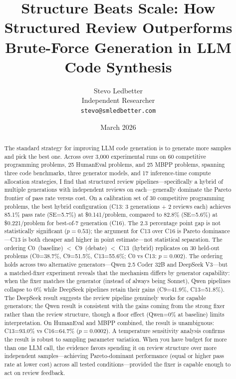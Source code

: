 \documentclass{article}
\title{Structure Beats Scale: How Structured Review Outperforms Brute-Force Generation in LLM Code Synthesis}
\author{
  Stevo Ledbetter \\
  Independent Researcher \\
  \texttt{stevo@smledbetter.com}
}
\date{March 2026}
\begin{document}
\maketitle

\begin{abstract}
The standard strategy for improving LLM code generation is to generate more samples and pick the best one. Across over 3,000 experimental runs on 60 competitive programming problems, 25 HumanEval problems, and 25 MBPP problems, spanning three code benchmarks, three generator models, and 17 inference-time compute allocation strategies, I find that structured review pipelines---specifically a hybrid of multiple generations with independent reviews on each---generally dominate the Pareto frontier of pass rate versus cost. On a calibration set of 30 competitive programming problems, the best hybrid configuration (C13: 3 generations + 2 reviews each) achieves 85.1\% pass rate (SE=5.7\%) at \$0.141/problem, compared to 82.8\% (SE=5.6\%) at \$0.221/problem for best-of-7 generation (C16). The 2.3 percentage point gap is not statistically significant ($p=0.53$); the argument for C13 over C16 is Pareto dominance---C13 is both cheaper and higher in point estimate---not statistical separation. The ordering C0~(baseline) $<$ C9~(debate) $<$ C13~(hybrid) replicates on 30 held-out problems (C0=38.7\%, C9=51.5\%, C13=55.6\%; C0 vs C13: $p=0.002$). The ordering holds across two alternative generators---Qwen 2.5 Coder 32B and DeepSeek V3---but a matched-fixer experiment reveals that the mechanism differs by generator capability: when the fixer matches the generator (instead of always being Sonnet), Qwen pipelines collapse to 0\% while DeepSeek pipelines retain their gains (C9=41.9\%, C13=51.8\%). The DeepSeek result suggests the review pipeline genuinely works for capable generators; the Qwen result is consistent with the gains coming from the strong fixer rather than the review structure, though a floor effect (Qwen=0\% at baseline) limits interpretation. On HumanEval and MBPP combined, the result is unambiguous: C13=93.0\% vs C16=64.7\% ($p=0.0002$). A temperature sensitivity analysis confirms the result is robust to sampling parameter variation. When you have budget for more than one LLM call, the evidence favors spending it on review structure over more independent samples---achieving Pareto-dominant performance (equal or higher pass rate at lower cost) across all tested conditions---provided the fixer is capable enough to act on review feedback.
\end{abstract}
\end{document}
